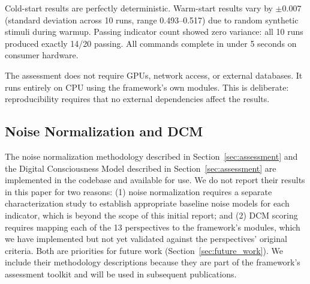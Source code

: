 Cold-start results are perfectly deterministic. Warm-start results vary by $\pm 0.007$ (standard deviation across 10 runs, range 0.493--0.517) due to random synthetic stimuli during warmup. Passing indicator count showed zero variance: all 10 runs produced exactly 14/20 passing. All commands complete in under 5 seconds on consumer hardware.

The assessment does not require GPUs, network access, or external databases. It runs entirely on CPU using the framework's own modules. This is deliberate: reproducibility requires that no external dependencies affect the results.

\subsection{Noise Normalization and DCM}
\label{sec:noise-dcm-results}

The noise normalization methodology described in Section~\ref{sec:assessment} and the Digital Consciousness Model described in Section~\ref{sec:assessment} are implemented in the codebase and available for use. We do not report their results in this paper for two reasons: (1) noise normalization requires a separate characterization study to establish appropriate baseline noise models for each indicator, which is beyond the scope of this initial report; and (2) DCM scoring requires mapping each of the 13 perspectives to the framework's modules, which we have implemented but not yet validated against the perspectives' original criteria. Both are priorities for future work (Section~\ref{sec:future_work}). We include their methodology descriptions because they are part of the framework's assessment toolkit and will be used in subsequent publications.

